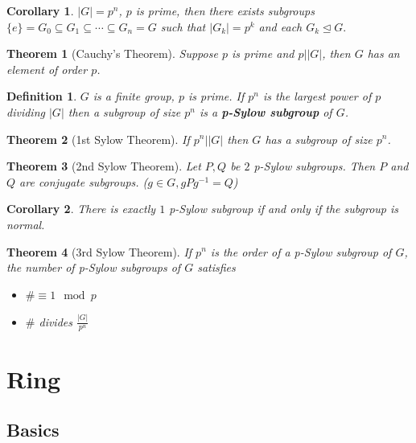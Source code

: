 \documentclass[12pt]{article}
\newtheorem{definition}{Definition}[subsection]
\newtheorem{theorem}{Theorem}[subsection]
\newtheorem{corollary}{Corollary}[subsection]
\begin{document}
			\begin{corollary}
				$|G| = p^n$, $p$ is prime, then there exists subgroups $\{e\} = G_0 \subseteq G_1 \subseteq \cdots \subseteq G_n = G$ such that $|G_k| = p^k$ and each $G_k \unlhd G.$
			\end{corollary}
			
			\begin{theorem}[Cauchy's Theorem]
				Suppose $p$ is prime and $p | |G|$, then $G$ has an element of order $p$.
			\end{theorem}
			
			\begin{definition}
				$G$ is a finite group, $p$ is prime. If $p^n$ is the largest power of $p$ dividing $|G|$ then a subgroup of size $p^n$ is a \textbf{p-Sylow subgroup} of $G$.
			\end{definition}
		
		
			\begin{theorem}[1st Sylow Theorem]
				If $p^n | |G|$ then $G$ has a subgroup of size $p^n$.
			\end{theorem}
		
			\begin{theorem}[2nd Sylow Theorem]
				Let $P, Q$ be $2$ p-Sylow subgroups. Then $P$ and $Q$ are conjugate subgroups. ($g \in G, gPg^{-1} = Q$)
			\end{theorem}
			
			\begin{corollary}
				There is exactly $1$ p-Sylow subgroup if and only if the subgroup is normal.
			\end{corollary}
			
			\begin{theorem}[3rd Sylow Theorem]
				If $p^n$ is the order of a p-Sylow subgroup of $G$, the number of p-Sylow subgroups of $G$ satisfies
					\begin{itemize}
						\item $\# \equiv 1 \mod p$
						\item $\#$ divides $\frac{|G|}{p^n}$
					\end{itemize}
			\end{theorem}
		
		
		\section{Ring}
		
		\subsection{Basics}
		
\end{document}
